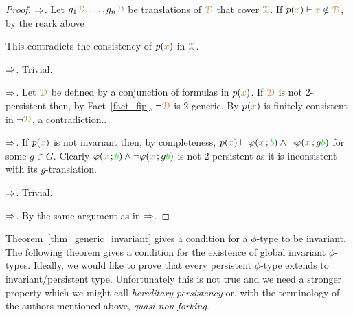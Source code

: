\begin{proof}
  $\Rightarrow$.
  Let $g_1{\color{brown}\EuScript D},\dots,g_n{\color{brown}\EuScript D}$ be translations of ${\color{brown}\EuScript D}$ that cover ${\color{brown}\EuScript X}$.
  If $p({\color{brown} x})\vdash {\color{brown}x}\notin{\color{brown}\EuScript D}$, by the reark above


  This contradicts the consistency of $p({\color{brown} x})$ in ${\color{brown}\EuScript X}$.

  $\Rightarrow$.
  Trivial.
  
  $\Rightarrow$.
  Let ${\color{brown}\EuScript D}$ be defined by a conjunction of formulas in $p({\color{brown} x})$.
  If ${\color{brown}\EuScript D}$ is not 2-persistent then, by Fact~\ref{fact_fip}, $\neg{\color{brown}\EuScript D}$ is 2-generic. 
  By  $p({\color{brown} x})$ is finitely consistent in   $\neg{\color{brown}\EuScript D}$, a contradiction..

  $\Rightarrow$.
  If $p({\color{brown} x})$ is not invariant then, by completeness, $p({\color{brown} x})\vdash\varphi({\color{brown} x}\,;{\color{green} b})\wedge\neg\varphi({\color{brown} x}\,;g{\color{green} b})$ for some $g\in G$.
  Clearly $\varphi({\color{brown} x}\,;{\color{green} b})\wedge\neg\varphi({\color{brown} x}\,;g{\color{green} b})$ is not 2-persistent as it is inconsistent with its $g$-translation.

  $\Rightarrow$.
  Trivial.

  $\Rightarrow$.
  By the same argument as in $\Rightarrow$.
\end{proof}


Theorem~\ref{thm_generic_invariant} gives a condition for a $\phi$-type to be invariant.
The following theorem gives a condition for the existence of global invariant $\phi$-types.
Ideally, we would like to prove that every persistent $\phi$-type extends to invariant/persistent type.
Unfortunately this is not true and we need a stronger property which we might call \textit{hereditary persistency\/} 
or, with the terminology of the authors mentioned above, \textit{quasi-non-forking}.

